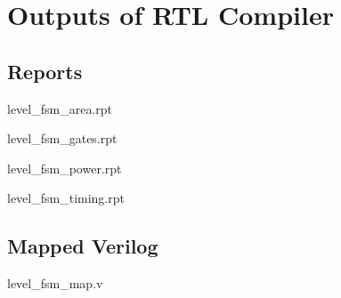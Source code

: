 \documentclass[11pt]{article}
\begin{document}
\section{Outputs of RTL Compiler}
\subsection{Reports}
level{\_}fsm{\_}area.rpt

level{\_}fsm{\_}gates.rpt

level{\_}fsm{\_}power.rpt

level{\_}fsm{\_}timing.rpt

\subsection{Mapped Verilog}
level{\_}fsm{\_}map.v

\end{document}
